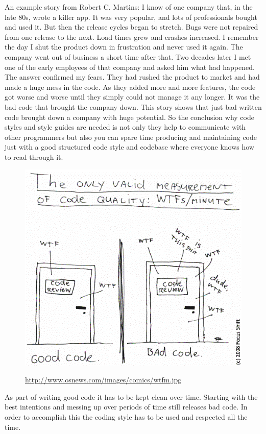 An example story from Robert C. Martins:
I know of one company that, in the late 80s, wrote a killer app. It was very popular, and lots of professionals bought and used it. But then the release cycles began to stretch. Bugs were not repaired from one release to the next. Load times grew and crashes increased. I remember the day I shut the product down in frustration and never used it again. The company went out of business a short time after that. Two decades later I met one of the early employees of that company and asked him what had happened. The answer confirmed my fears. They had rushed the product to market and had made a huge mess in the code. As they added more and more features, the code got worse and worse until they simply could not manage it any longer. It was the bad code that brought the company down. \citep{Martin-Code-2008}
This story shows that just bad written code brought down a company with huge potential. So the conclusion why code styles and style guides are needed is not only they help to communicate with other programmers but also you can spare time producing and maintaining code just with a good structured code style and codebase where everyone knows how to read through it.

\begin{figure}[!htbp] 
	\centering
	\includegraphics[width=0.7\columnwidth]{img/wtfcode.png}
	\label{fig:CodeMeasurement}
	\caption{\url{http://www.osnews.com/images/comics/wtfm.jpg}}
\end{figure}

As part of writing good code it has to be kept clean over time. Starting with the best intentions and messing up over periods of time still releases bad code. In order to accomplish this the coding style has to be used and respected all the time.

